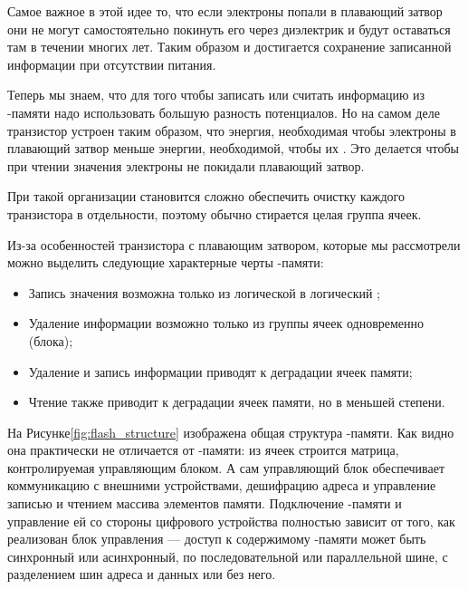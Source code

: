 \par{Самое важное в этой идее то, что если электроны попали в плавающий затвор они не могут самостоятельно покинуть его через диэлектрик и будут оставаться там в течении многих лет. Таким образом и достигается сохранение записанной информации при отсутствии питания.}

\par{Теперь мы знаем, что для того чтобы записать или считать информацию из -памяти надо использовать большую разность потенциалов. Но на самом деле транзистор устроен таким образом, что энергия, необходимая чтобы  электроны в плавающий затвор меньше энергии, необходимой, чтобы их . Это делается чтобы при чтении значения электроны не покидали плавающий затвор.}

\par{При такой организации становится сложно обеспечить очистку каждого транзистора в отдельности, поэтому обычно стирается целая группа ячеек.}

\par{Из-за особенностей транзистора с плавающим затвором, которые мы рассмотрели можно выделить следующие характерные черты -памяти:
\begin{itemize}
  \item Запись значения возможна только из логической  в логический ;
  \item Удаление информации возможно только из группы ячеек одновременно (блока);
  \item Удаление и запись информации приводят к деградации ячеек памяти;
  \item Чтение также приводит к деградации ячеек памяти, но в меньшей степени.
\end{itemize}}

\par{На Рисунке\ref{fig:flash_structure} изображена общая структура -памяти. Как видно она практически не отличается от -памяти: из ячеек строится матрица, контролируемая управляющим блоком. А сам управляющий блок обеспечивает коммуникацию с внешними устройствами, дешифрацию адреса и управление записью и чтением массива элементов памяти. Подключение -памяти и управление ей со стороны цифрового устройства полностью зависит от того, как реализован блок управления --- доступ к содержимому -памяти может быть синхронный или асинхронный, по последовательной или параллельной шине, с разделением шин адреса и данных или без него.}

